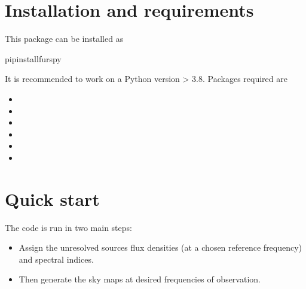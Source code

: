 \documentclass[letterpaper,10pt,english]{sphinxmanual}
\begin{document}
\section{Installation and requirements}
\label{\detokenize{basics:installation-and-requirements}}
\sphinxAtStartPar
This package can be installed as

\begin{sphinxVerbatim}[commandchars=\\\{\}]
pipinstallfurspy
\end{sphinxVerbatim}

\sphinxAtStartPar
It is recommended to work on a Python version \textgreater{} 3.8. Packages required are
\begin{itemize}
\item {} 
\sphinxAtStartPar
{}

\item {} 
\sphinxAtStartPar
{}

\item {} 
\sphinxAtStartPar
{}

\item {} 
\sphinxAtStartPar
{}

\item {} 
\sphinxAtStartPar
{}

\item {} 
\sphinxAtStartPar
{}

\end{itemize}


\section{Quick start}
\label{\detokenize{basics:quick-start}}
\sphinxAtStartPar
The code is run in two main steps:
\begin{itemize}
\item {} 
\sphinxAtStartPar
Assign the unresolved sources flux densities (at a chosen reference frequency) and spectral indices.

\item {} 
\sphinxAtStartPar
Then generate the sky maps at desired frequencies of observation.

\end{itemize}
\end{document}
